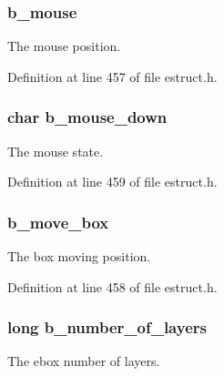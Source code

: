 \hypertarget{struct__ebox_a8831d355ec1dbb2dca9a68268a977965}{
\subsubsection[{b\-\_\-mouse}]{ b\-\_\-mouse}}\label{struct__ebox_a8831d355ec1dbb2dca9a68268a977965}
The mouse position. 

Definition at line 457 of file estruct.\-h.

\hypertarget{struct__ebox_a1dc439a4d35e98f78370c81ceadc8ea0}{
\subsubsection[{b\-\_\-mouse\-\_\-down}]{\setlength{\rightskip}{0pt plus 5cm}char b\-\_\-mouse\-\_\-down}}\label{struct__ebox_a1dc439a4d35e98f78370c81ceadc8ea0}
The mouse state. 

Definition at line 459 of file estruct.\-h.

\hypertarget{struct__ebox_a2b028829ae54f8ccede6bb0d5903f7fd}{
\subsubsection[{b\-\_\-move\-\_\-box}]{ b\-\_\-move\-\_\-box}}\label{struct__ebox_a2b028829ae54f8ccede6bb0d5903f7fd}
The box moving position. 

Definition at line 458 of file estruct.\-h.

\hypertarget{struct__ebox_a84105957ca11a224cf734f350fb23ac9}{
\subsubsection[{b\-\_\-number\-\_\-of\-\_\-layers}]{\setlength{\rightskip}{0pt plus 5cm}long b\-\_\-number\-\_\-of\-\_\-layers}}\label{struct__ebox_a84105957ca11a224cf734f350fb23ac9}
The ebox number of layers. 

